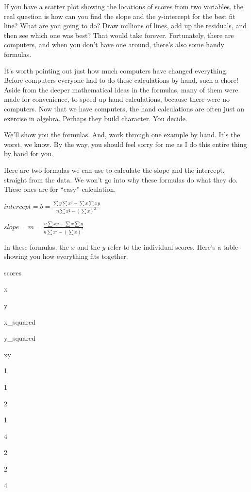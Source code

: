 \documentclass[
]{book}
\begin{document}
If you have a scatter plot showing the locations of scores from two variables, the real question is how can you find the slope and the y-intercept for the best fit line? What are you going to do? Draw millions of lines, add up the residuals, and then see which one was best? That would take forever. Fortunately, there are computers, and when you don't have one around, there's also some handy formulas.

\begin{marginnote}

It's worth pointing out just how much computers have changed everything. Before computers everyone had to do these calculations by hand, such a chore! Aside from the deeper mathematical ideas in the formulas, many of them were made for convenience, to speed up hand calculations, because there were no computers. Now that we have computers, the hand calculations are often just an exercise in algebra. Perhaps they build character. You decide.

\end{marginnote}

We'll show you the formulas. And, work through one example by hand. It's the worst, we know. By the way, you should feel sorry for me as I do this entire thing by hand for you.

Here are two formulas we can use to calculate the slope and the intercept, straight from the data. We won't go into why these formulas do what they do. These ones are for ``easy'' calculation.

\(intercept = b = \frac{\sum{y}\sum{x^2}-\sum{x}\sum{xy}}{n\sum{x^2}-(\sum{x})^2}\)

\(slope = m = \frac{n\sum{xy}-\sum{x}\sum{y}}{n\sum{x^2}-(\sum{x})^2}\)

In these formulas, the \(x\) and the \(y\) refer to the individual scores. Here's a table showing you how everything fits together.

scores

x

y

x\_squared

y\_squared

xy

1

1

2

1

4

2

2

4
\end{document}
